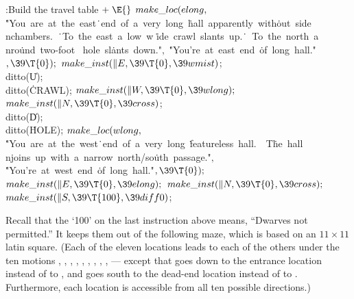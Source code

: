 \Y\B\4:Build the travel table\X${}\mathrel+\E{}$\6
$\\{make\_loc}(\\{elong},{}$\6
\.{"You\ are\ at\ the\ east}\)\.{\ end\ of\ a\ very\ long\ }\)\.{hall\
apparently\ with}\)\.{out\ side\\nchambers.\ }\)\.{\ To\ the\ east\ a\ low\ w}%
\)\.{ide\ crawl\ slants\ up.}\)\.{\ \ To\ the\ north\ a\\nro}\)\.{und\ two-foot%
\ hole\ sl}\)\.{ants\ down."}${},{}$\6
\.{"You're\ at\ east\ end\ }\)\.{of\ long\ hall."}${},\39\T{0});{}$\6
${}\\{make\_inst}(\|E,\39\T{0},\39\\{wmist}){}$;\5
\\{ditto}(\|U);\5
\\{ditto}(\.{CRAWL});\6
${}\\{make\_inst}(\|W,\39\T{0},\39\\{wlong});{}$\6
${}\\{make\_inst}(\|N,\39\T{0},\39\\{cross}){}$;\5
\\{ditto}(\|D);\5
\\{ditto}(\.{HOLE});\7
${}\\{make\_loc}(\\{wlong},{}$\6
\.{"You\ are\ at\ the\ west}\)\.{\ end\ of\ a\ very\ long\ }\)\.{featureless\
hall.\ \ T}\)\.{he\ hall\\njoins\ up\ wi}\)\.{th\ a\ narrow\ north/so}\)\.{uth\
passage."}${},{}$\6
\.{"You're\ at\ west\ end\ }\)\.{of\ long\ hall."}${},\39\T{0});{}$\6
${}\\{make\_inst}(\|E,\39\T{0},\39\\{elong});{}$\6
${}\\{make\_inst}(\|N,\39\T{0},\39\\{cross});{}$\6
${}\\{make\_inst}(\|S,\39\T{100},\39\\{diff0}){}$;\par
\fi

Recall that the `100' on the last instruction above means, ``Dwarves
not permitted.'' It keeps them out of the following maze, which is
based on an $11\times11$ latin square. (Each of the eleven locations
leads to each of the others under the ten motions \PB{\|N}, \PB{\|S}, ,
\PB{\|W},
\PB{\.{NE}}, \PB{\.{SE}}, \PB{\.{NW}}, \PB{\.{SW}}, \PB{\|U},  ---
except that \PB{\\{diff0}} goes down to
the entrance location  instead of to , and \PB{%
\\{diff10}} goes
south to the dead-end location  instead of to .
Furthermore,
each location is accessible from all ten possible directions.)

